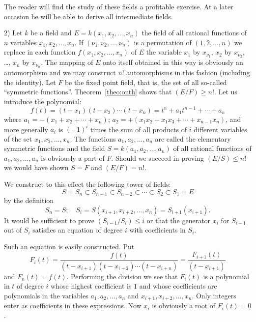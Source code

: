 \documentclass[11pt]{article}
\theoremstyle{definition}
\begin{document}
The reader will find the study of these fields a profitable exercise.
At a later occasion he will be able to derive all intermediate fields.


2)
Let $k$ be a field and $E = k(x_1, x_2, \ldots, x_n)$ the field of all rational functions of $n$ variables $x_1,x_2, \ldots, x_n$.
If $(\nu_1, \nu_2, \ldots, \nu_n)$ is a permutation of $(1,2,\ldots,n)$ we replace in each function $f(x_1,x_2,\ldots,x_n)$ of $E$ the variable $x_1$ by $x_{\nu_1}$, $x_2$ by $x_{\nu_2}$, \ldots, $x_n$ by $x_{\nu_n}$.
The mapping of $E$ onto itself obtained in this way is obviously an automorphism and we may construct $n!$ automorphisms in this fashion (including the identity).
Let $F$ be the fixed point field, that is, the set of all so-called ``symmetric functions''.
Theorem~\ref{theo:onth} shows that $(E/F) \geq n!$.
Let us introduce the polynomial:
\begin{equation}
\label{eq:twGth}
f(t) = (t-x_1)(t-x_2) \cdots (t-x_n)
= t^n + a_1 t^{n-1} + \cdots + a_n
\end{equation}
where $a_1 = -(x_1 + x_2 + \cdots + x_n)$; $a_2 = +(x_1x_2 + x_1x_3 + \cdots + x_{n-1}x_n)$, and more generally $a_i$ is $(-1)^i$ times the sum of all products of $i$ different variables of the set $x_1, x_2, \ldots, x_n$.
The functions $a_1, a_2, \ldots, a_n$ are called the elementary symmetric functions and the field $S = k(a_1, a_2, \ldots, a_n)$ of all rational functions of $a_1, a_2, \ldots, a_n$ is obviously a part of $F$.
Should we succeed in proving $(E/S) \leq n!$ we would have shown $S = F$ and $(E/F) = n!$.

We construct to this effect the following tower of fields:
\[
S = S_n
\subset S_{n-1}
\subset S_{n-2}
\subset \cdots
\subset S_2
\subset S_1 = E
\]
by the definition
\begin{equation}
\label{eq:twGfo}
S_n = S;
\quad
S_i = S(x_{i+1}, x_{i+2}, \ldots, x_n) = S_{i+1}(x_{i+1}).
\end{equation}
It would be sufficient to prove $(S_{i-1} / S_i) \leq i$ or that the generator $x_i$ for $S_{i-1}$ out of $S_i$ satisfies an equation of degree $i$ with coefficients in $S_i$.

Such an equation is easily constructed.
Put
\begin{equation}
\label{eq:twGfi}
F_i(t)
= \frac{f(t)}{(t-x_{i+1})(t-x_{i+2}) \cdots (t-x_{i+n})}
= \frac{F_{i+1}(t)}{(t-x_{i+1})}
\end{equation}
and $F_n(t) = f(t)$.
Performing the division we see that $F_i(t)$ is a polynomial in $t$ of degree $i$ whose highest coefficient is $1$ and whose coefficients are polynomials in the variables $a_1, a_2, \ldots, a_n$ and $x_{i+1}, x_{i+2}, \ldots, x_n$.
Only integers enter as coefficients in these expressions.
Now $x_i$ is obviously a root of $F_i(t) = 0$.
\end{document}
